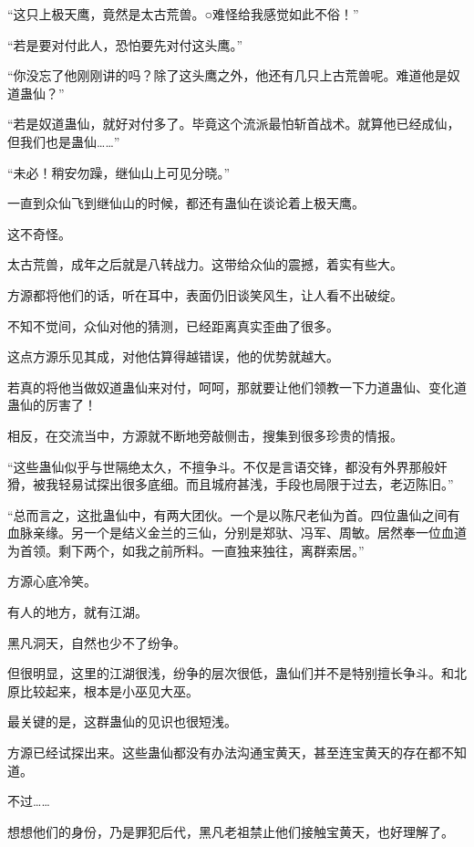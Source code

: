 
\begin{this_body}

“这只上极天鹰，竟然是太古荒兽。○难怪给我感觉如此不俗！”

“若是要对付此人，恐怕要先对付这头鹰。”

“你没忘了他刚刚讲的吗？除了这头鹰之外，他还有几只上古荒兽呢。难道他是奴道蛊仙？”

“若是奴道蛊仙，就好对付多了。毕竟这个流派最怕斩首战术。就算他已经成仙，但我们也是蛊仙……”

“未必！稍安勿躁，继仙山上可见分晓。”

一直到众仙飞到继仙山的时候，都还有蛊仙在谈论着上极天鹰。

这不奇怪。

太古荒兽，成年之后就是八转战力。这带给众仙的震撼，着实有些大。

方源都将他们的话，听在耳中，表面仍旧谈笑风生，让人看不出破绽。

不知不觉间，众仙对他的猜测，已经距离真实歪曲了很多。

这点方源乐见其成，对他估算得越错误，他的优势就越大。

若真的将他当做奴道蛊仙来对付，呵呵，那就要让他们领教一下力道蛊仙、变化道蛊仙的厉害了！

相反，在交流当中，方源就不断地旁敲侧击，搜集到很多珍贵的情报。

“这些蛊仙似乎与世隔绝太久，不擅争斗。不仅是言语交锋，都没有外界那般奸猾，被我轻易试探出很多底细。而且城府甚浅，手段也局限于过去，老迈陈旧。”

“总而言之，这批蛊仙中，有两大团伙。一个是以陈尺老仙为首。四位蛊仙之间有血脉亲缘。另一个是结义金兰的三仙，分别是郑驮、冯军、周敏。居然奉一位血道为首领。剩下两个，如我之前所料。一直独来独往，离群索居。”

方源心底冷笑。

有人的地方，就有江湖。

黑凡洞天，自然也少不了纷争。

但很明显，这里的江湖很浅，纷争的层次很低，蛊仙们并不是特别擅长争斗。和北原比较起来，根本是小巫见大巫。

最关键的是，这群蛊仙的见识也很短浅。

方源已经试探出来。这些蛊仙都没有办法沟通宝黄天，甚至连宝黄天的存在都不知道。

不过……

想想他们的身份，乃是罪犯后代，黑凡老祖禁止他们接触宝黄天，也好理解了。


\end{this_body}
